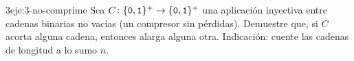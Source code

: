 \begin{ejercicio}{3}{eje:3-no-comprime}
Sea $C\colon\{\textnormal{\texttt{0}},\textnormal{\texttt{1}}\}^{+}\to\{\textnormal{\texttt{0}},\textnormal{\texttt{1}}\}^{+}$ una aplicación inyectiva entre cadenas binarias no vacías (un compresor sin pérdidas). Demuestre que, si $C$ acorta alguna cadena, entonces alarga alguna otra. Indicación: cuente las cadenas de longitud a lo sumo $n$.
\end{ejercicio}
